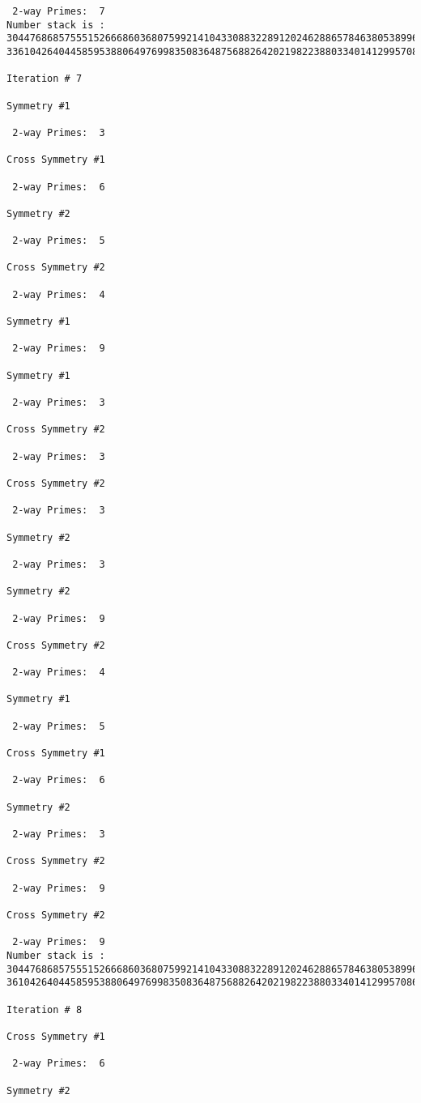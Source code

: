 \begin{verbatim}
 2-way Primes: 	7
Number stack is :
30447686857555152666860368075992141043308832289120246288657846380538996794608835958544046240163340857
33610426404458595388064976998350836487568826420219822388033401412995708630686662515557586867440375804

Iteration #	7

Symmetry #1

 2-way Primes: 	3

Cross Symmetry #1

 2-way Primes: 	6

Symmetry #2

 2-way Primes: 	5

Cross Symmetry #2

 2-way Primes: 	4

Symmetry #1

 2-way Primes: 	9

Symmetry #1

 2-way Primes: 	3

Cross Symmetry #2

 2-way Primes: 	3

Cross Symmetry #2

 2-way Primes: 	3

Symmetry #2

 2-way Primes: 	3

Symmetry #2

 2-way Primes: 	9

Cross Symmetry #2

 2-way Primes: 	4

Symmetry #1

 2-way Primes: 	5

Cross Symmetry #1

 2-way Primes: 	6

Symmetry #2

 2-way Primes: 	3

Cross Symmetry #2

 2-way Primes: 	9

Cross Symmetry #2

 2-way Primes: 	9
Number stack is :
30447686857555152666860368075992141043308832289120246288657846380538996794608835958544046240163340857
36104264044585953880649769983508364875688264202198223880334014129957086306866625155575868674403758043

Iteration #	8

Cross Symmetry #1

 2-way Primes: 	6

Symmetry #2


\end{verbatim}
